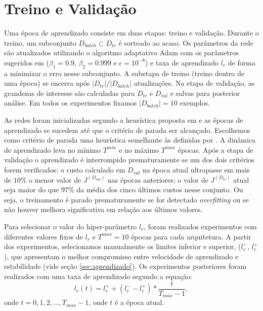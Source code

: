 \section{Treino e Validação}

Uma época de aprendizado consiste em duas etapas: treino e validação. Durante o treino, um subconjunto $D_{batch} \subset D_{tr}$ é sorteado ao acaso. Os parâmetros da rede são atualizados utilizando o algoritmo adaptativo Adam com os parâmetros sugeridos em\cite{adam_op} ($\beta_1 = 0.9$, $\beta_2 = 0.999$ e $\epsilon = 10^{-8}$) e taxa de aprendizado $l_r$ de forma a minimizar o erro nesse subconjunto. A subetapa de treino (treino dentro de uma época) se encerra após $|D_{tr}|/|D_{batch}|$ atualizações. Na etapa de validação, as grandezas de interesse são calculadas para $D_{tr}$ e $D_{val}$ e salvas para posterior análise. Em todos os experimentos fixamos $|D_{batch}| = 10$ exemplos.

As redes foram inicializadas segundo a heurística proposta em \cite{HeZR015relu} e as épocas de aprendizado se sucedem até que o critério de parada ser alcançado. Escolhemos como critério de parada uma heurística semelhante às definidas por \cite{lutz_early_stop}. A dinâmica de aprendizado leva no mínimo $T^{min}$ e no máximo $T^{max}$ épocas. Após a etapa de validação o aprendizado é interrompido prematuramente se um dos dois critérios forem verificados: o custo calculado em $D_{val}$ na época atual ultrapasse em mais de $10\%$ o menor valor de $J^{(D_{val})}$ nas épocas anteriores; o valor de $J^{(D_{tr})}$ atual seja maior do que $97\%$ da média dos cinco últimos custos nesse conjunto. Ou seja, o treinamento é parado prematuramente se for detectado \textit{overfitting} ou se não houver melhora significativa em relação aos últimos valores.

Para selecionar o valor do hiper-parâmetro $l_r$, foram realizados experimentos com diferentes valores fixos de $l_r$ e $T^{max}=10$ épocas para cada arquitetura. A partir dos experimentos, selecionamos manualmente os limites inferior e superior, ($l_r^-$, $l_r^+$), que apresentam o melhor compromisso entre velocidade de aprendizado e estabilidade (vide seção \ref{sec:aprendizado}). Os experimentos posteriores foram realizados com uma taxa de aprendizado segundo a equação:
\begin{equation}
l_r(t) = l_r^+ + (l_r^- - l_r^+) * \frac{t}{T_{max}-1},
\end{equation}
onde $t = 0, 1, 2, \ldots, T_{max}-1$, onde $t$ é a época atual.

